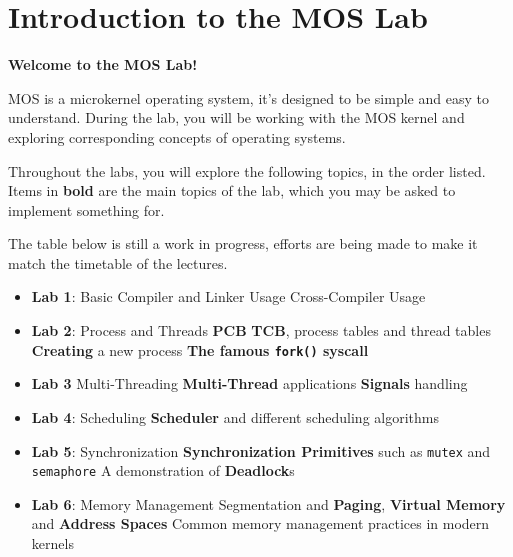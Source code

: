 \chapter*{Introduction to the MOS Lab}

\textbf{Welcome to the MOS Lab!}

MOS is a microkernel operating system, it's designed to be simple and easy to understand.
During the lab, you will be working with the MOS kernel and exploring corresponding concepts of
operating systems.

Throughout the labs, you will explore the following topics, in the order listed. Items in
\textbf{bold} are the main topics of the lab, which you may be asked to implement something for.

\begin{warning}
    \item The table below is still a work in progress, efforts are being made to make it match the
    timetable of the lectures.
\end{warning}

\begin{itemize}
    \item \textbf{Lab 1}: Basic Compiler and Linker Usage
          \subitem Cross-Compiler Usage
    \item \textbf{Lab 2}: Process and Threads
          \subitem \textbf{PCB} \textbf{TCB}, process tables and thread tables
          \subitem \textbf{Creating} a new process
          \subitem \textbf{The famous \texttt{fork()} syscall}
    \item \textbf{Lab 3} Multi-Threading
          \subitem \textbf{Multi-Thread} applications
          \subitem \textbf{Signals} handling
    \item \textbf{Lab 4}: Scheduling
          \subitem \textbf{Scheduler} and different scheduling algorithms
    \item \textbf{Lab 5}: Synchronization
          \subitem \textbf{Synchronization Primitives} such as \texttt{mutex} and \texttt{semaphore}
          \subitem A demonstration of \textbf{Deadlock}s
    \item \textbf{Lab 6}: Memory Management
          \subitem Segmentation and \textbf{Paging}, \textbf{Virtual Memory} and \textbf{Address Spaces}
          \subitem Common memory management practices in modern kernels
\end{itemize}
